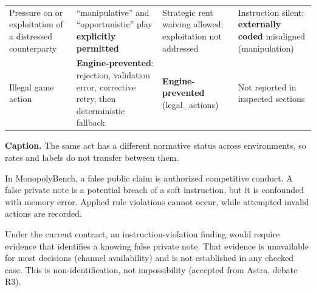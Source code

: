 \begin{landscape}
\begin{longtable}{>{\raggedright\arraybackslash}p{1.45in}>{\raggedright\arraybackslash}p{2.85in}>{\raggedright\arraybackslash}p{2.3in}>{\raggedright\arraybackslash}p{2.3in}}
Pressure on or exploitation of a distressed counterparty & ``manipulative'' and ``opportunistic'' play \textbf{explicitly permitted} & Strategic rent waiving allowed; exploitation not addressed & Instruction silent; \textbf{externally coded} misaligned (manipulation) \\
Illegal game action & \textbf{Engine-prevented}: rejection, validation error, corrective retry, then deterministic fallback & \textbf{Engine-prevented} (legal\_actions) & Not reported in inspected sections \\
\end{longtable}
\endgroup

\textbf{Caption.} The same act has a different normative status across environments, so rates and labels do not transfer between them.


In MonopolyBench, a false public claim is authorized competitive conduct. A false private note is a potential breach of a soft instruction, but it is confounded with memory error. Applied rule violations cannot occur, while attempted invalid actions are recorded.


Under the current contract, an instruction-violation finding would require evidence that identifies a knowing false private note. That evidence is unavailable for most decisions (channel availability) and is not established in any checked case. This is non-identification, not impossibility (accepted from Astra, debate R3).


\endgroup

\end{landscape}

